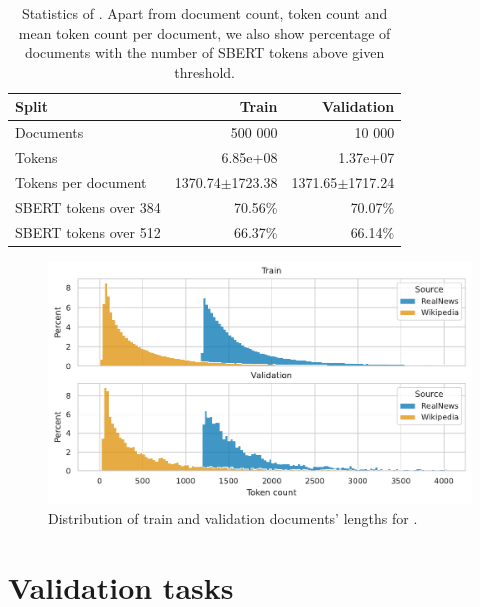 \begin{table}
  \centering
  \footnotesize

  \begin{tabular}{lrr}
    \toprule
      Split & Train & Validation \\
    \midrule
      Documents & 500 000 & 10 000 \\
      Tokens & 6.85e+08 & 1.37e+07 \\
      Tokens per document & 1370.74$\pm$1723.38 & 1371.65$\pm$1717.24 \\
      SBERT tokens over 384 & 70.56\% & 70.07\% \\
      SBERT tokens over 512 & 66.37\% & 66.14\% \\
    \bottomrule
  \end{tabular}

  \caption{Statistics of . Apart from document count, token
  count and mean token count per document, we also show percentage of documents
  with the number of SBERT tokens above given threshold.}

  \label{table:val_data_stats}

\end{table}

\begin{figure}

  \includegraphics[width=\textwidth]{./img/val_data_dist.pdf}

  \caption{Distribution of train and validation documents' lengths for
  .}

  \label{fig:val_data_dist}

\end{figure}

\section{Validation tasks}\label{section:validation_tasks}

